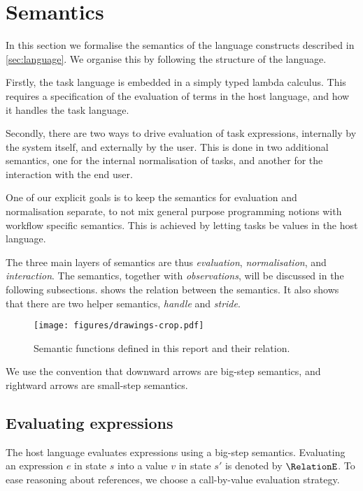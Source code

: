 


\section{Semantics}
\label{sec:semantics}

In this section we formalise the semantics of the language constructs described in \cref{sec:language}.
We organise this by following the structure of the language.

Firstly, the task language is embedded in a simply typed lambda calculus.
This requires a specification of the evaluation of terms in the host language, and how it handles the task language.

Secondly, there are two ways to drive evaluation of task expressions, internally by the system itself, and externally by the user.
This is done in two additional semantics, one for the internal normalisation of tasks, and another for the interaction with the end user.

One of our explicit goals is to keep the semantics for evaluation and normalisation separate,
to not mix general purpose programming notions with workflow specific semantics.
This is achieved by letting tasks be values in the host language.

The three main layers of semantics are thus \emph{evaluation}, \emph{normalisation}, and \emph{interaction}.
The semantics, together with \emph{observations}, will be discussed in the following subsections.
 shows the relation between the semantics.
It also shows that there are two helper semantics, \emph{handle} and \emph{stride}.

\begin{figure}[h]
  \centering
  \texttt{[image: figures/drawings-crop.pdf]}
  \caption{
    Semantic functions defined in this report and their relation.
  }
  \label{fig:semantic-functions}
\end{figure}

We use the convention that downward arrows are big-step semantics, and rightward arrows are small-step semantics.



\subsection{Evaluating expressions}
\label{sec:evaluation}

The host language evaluates expressions using a big-step semantics.
Evaluating an expression $e$ in state $s$ into a value $v$ in state $s'$ is denoted by $\RelationE$.
To ease reasoning about references, we choose a call-by-value evaluation strategy.

